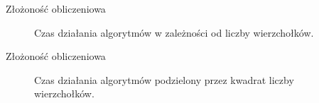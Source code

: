 \begin{frame}[squeeze]{Złożoność obliczeniowa}

    \begin{figure}[H]
        \centering
        \begin{minipage}[t]{0.9\textwidth}
            \centering
            \caption{Czas działania algorytmów w zależności od liczby wierzchołków.}
        \end{minipage}
    \end{figure} 
\end{frame}


\begin{frame}[squeeze]{Złożoność obliczeniowa}

    \begin{figure}[H]
        \centering
        \begin{minipage}[t]{0.9\textwidth}
            \centering
            \caption{Czas działania algorytmów podzielony przez kwadrat liczby wierzchołków.}
        \end{minipage}
    \end{figure} 
\end{frame}